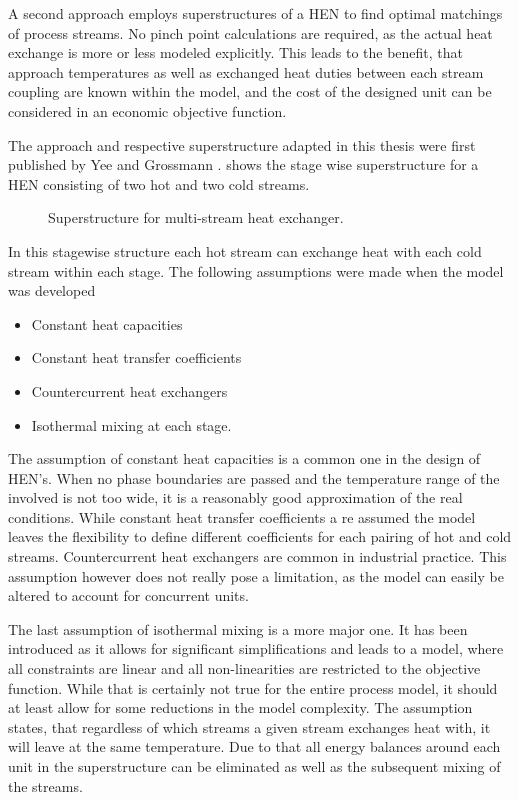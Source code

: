     A second approach employs superstructures of a HEN to find optimal matchings of process streams. No pinch
    point calculations are required, as the actual heat exchange is more or less modeled explicitly. This
    leads to the benefit, that approach temperatures as well as exchanged heat duties between each stream coupling
    are known within the model, and the cost of the designed unit can be considered in an economic objective
    function.

    The approach and respective superstructure adapted in this thesis were first published by Yee and Grossmann
    \cite{Yee.1990}.  shows the stage wise superstructure for a HEN consisting of two hot
    and two cold streams.

    \begin{figure}
        
        \caption{Superstructure for multi-stream heat exchanger. \cite{Yee.1990}}
        \label{fig:HX_super}
    \end{figure}

    In this stagewise structure each hot stream can exchange heat with each cold stream within each stage.
    The following assumptions were made when the model was developed
    \begin{itemize}
        \item Constant heat capacities
        \item Constant heat transfer coefficients
        \item Countercurrent heat exchangers
        \item Isothermal mixing at each stage.
    \end{itemize}

    The assumption of constant heat capacities is a common one in the design of HEN's. When no phase boundaries are passed
    and the temperature range of the involved is not too wide, it is a reasonably good approximation of the real conditions.
    While constant heat transfer coefficients a re assumed the model leaves the flexibility to define different
    coefficients for each pairing of hot and cold streams. Countercurrent heat exchangers are common in industrial practice.
    This assumption however does not really pose a limitation, as the model can easily be altered to account for concurrent
    units.

    The last assumption of isothermal mixing is a more major one. It has been introduced as it allows for significant
    simplifications and leads to a model, where all constraints are linear and all non-linearities are restricted
    to the objective function. While that is certainly not true for the entire process model, it should at least
    allow for some reductions in the model complexity. The assumption states, that regardless of which streams a
    given stream exchanges heat with, it will leave at the same temperature. Due to that all energy balances around
    each unit in the superstructure can be eliminated as well as the subsequent mixing of the streams.

